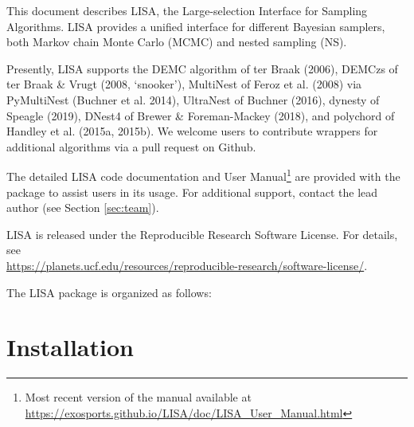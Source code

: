\documentclass[letterpaper, 12pt]{article}
\begin{document}
\noindent This document describes LISA, the Large-selection Interface for 
Sampling Algorithms.  LISA provides a unified interface for different 
Bayesian samplers, both Markov chain Monte Carlo (MCMC) and nested sampling 
(NS).  \newline

\noindent Presently, LISA supports the 
DEMC algorithm of ter Braak (2006), 
DEMCzs of ter Braak \& Vrugt (2008, `snooker'), 
MultiNest of Feroz et al. (2008) via PyMultiNest (Buchner et al. 2014), 
UltraNest of Buchner (2016), 
dynesty of Speagle (2019), 
DNest4 of Brewer & Foreman-Mackey (2018), and 
polychord of Handley et al. (2015a, 2015b).  
We welcome users to contribute wrappers for additional 
algorithms via a pull request on Github. \newline

\noindent The detailed LISA code documentation and User Manual\footnote{Most recent version of the manual available at 
\href{https://exosports.github.io/LISA/doc/LISA_User_Manual.html}{https://exosports.github.io/LISA/doc/LISA\_User\_Manual.html}} 
are provided with the package to assist users in its usage. 
For additional support, contact the lead author (see Section \ref{sec:team}). \newline

\noindent LISA is released under the Reproducible Research Software License.  
For details, see \\
\href{https://planets.ucf.edu/resources/reproducible-research/software-license/}{https://planets.ucf.edu/resources/reproducible-research/software-license/}.\newline

\noindent The LISA package is organized as follows: \newline
\noindent{}
\vspace{0.7cm}

\section{Installation}
\label{sec:installation}
\end{document}
